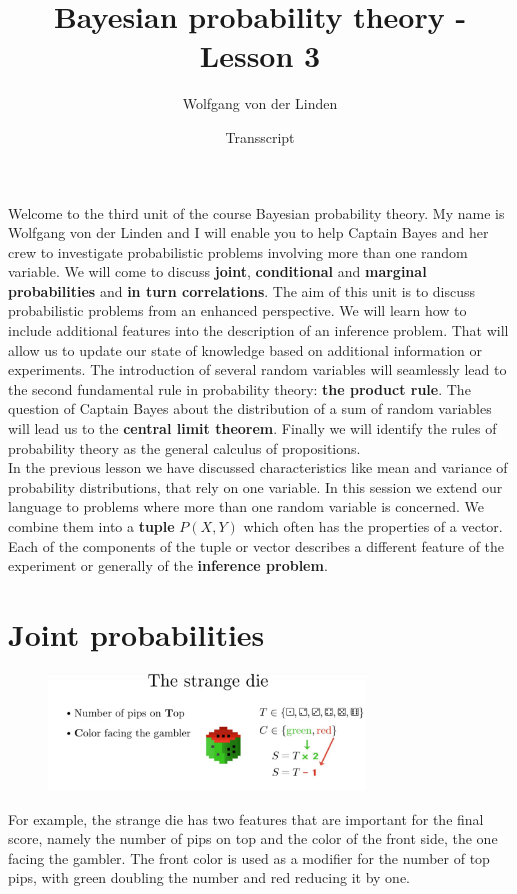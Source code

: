 \documentclass[12pt, a4paper]{scrartcl}
\title{Bayesian probability theory - Lesson 3}
\author{Wolfgang von der Linden}
\date{Transscript}
\begin{document}
\setlength{\parindent}{0pt}
\maketitle
\onehalfspacing

Welcome to the third unit of the course Bayesian probability theory. 
My name is Wolfgang von der Linden and I will enable you to help 
Captain Bayes and her crew to investigate probabilistic problems involving more than one random variable. We will come to discuss \textbf{joint}, \textbf{conditional} and \textbf{marginal probabilities} and \textbf{in turn correlations}.
The aim of this unit is to discuss probabilistic problems from an enhanced perspective. 
We will learn how to include additional features into the description of an inference problem. 
That will allow us to update our state of knowledge based on additional information or experiments.
The introduction of several random variables will seamlessly lead to the second fundamental rule in probability theory: \textbf{the product rule}.
The question of Captain Bayes about the distribution of a sum of random variables will lead us to the \textbf{central limit theorem}.
Finally we will identify the rules of probability theory as the general calculus of propositions.\\


In the previous lesson we have discussed characteristics like mean and variance of probability distributions, that rely on one variable.
In this session we extend our language to problems where more than one random variable is concerned. We combine them into a \textbf{tuple} $P(X,Y)$  which often has the properties of a vector. Each of the components of the tuple or vector describes a different feature of the experiment or generally of the \textbf{inference problem}.
\section*{Joint probabilities}
\begin{figure}[H]
	\centering
	\includegraphics[width=0.75\textwidth]{3_1.png}
\end{figure}
For example, the strange die has two features that are important for the final score, namely the number of pips on top and the color of the front side, the one facing the gambler.
The front color is used as a modifier for the number of top pips, with green doubling the number and red reducing it by one.\\
\end{document}
